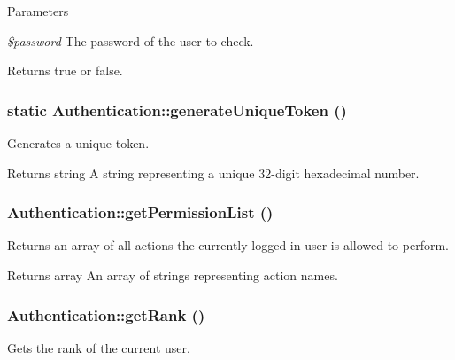 \begin{DoxyParams}{Parameters}
\item[{\em \$password}]The password of the user to check.\end{DoxyParams}
\begin{DoxyReturn}{Returns}
true or false. 
\end{DoxyReturn}
\hypertarget{classAuthentication_a8df399ee7f9eca617e6249935dae2a88}{
\subsubsection[{generateUniqueToken}]{\setlength{\rightskip}{0pt plus 5cm}static Authentication::generateUniqueToken ()}}
\label{classAuthentication_a8df399ee7f9eca617e6249935dae2a88}
Generates a unique token.

\begin{DoxyReturn}{Returns}
string A string representing a unique 32-\/digit hexadecimal number. 
\end{DoxyReturn}
\hypertarget{classAuthentication_a5e0187c1c057694e6dae84006a6944c7}{
\subsubsection[{getPermissionList}]{\setlength{\rightskip}{0pt plus 5cm}Authentication::getPermissionList ()}}
\label{classAuthentication_a5e0187c1c057694e6dae84006a6944c7}
Returns an array of all actions the currently logged in user is allowed to perform.

\begin{DoxyReturn}{Returns}
array An array of strings representing action names. 
\end{DoxyReturn}
\hypertarget{classAuthentication_a06867283805ffd4e223167cc15bbd800}{
\subsubsection[{getRank}]{\setlength{\rightskip}{0pt plus 5cm}Authentication::getRank ()}}
\label{classAuthentication_a06867283805ffd4e223167cc15bbd800}
Gets the rank of the current user.

